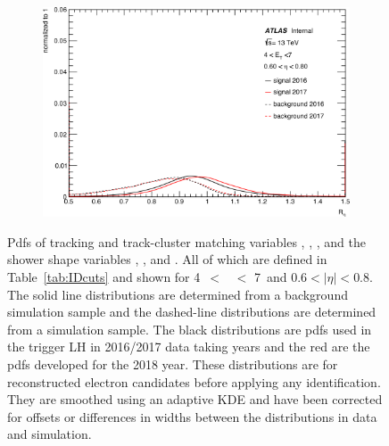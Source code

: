 \begin{figure}[p]
\begin{subfigure}[b]{0.49\textwidth}
    \includegraphics[width=1.0\textwidth]{figs/egamma/trig_reta_lowet.png} 
    \label{fig:egamma:trig_reta_lowet}
  \end{subfigure}
  \caption[Pdfs of tracking and track-cluster matching variables \TRTPID, \deltaeta, \deltaphires, and the shower shape variables \weta, \rhad, and \reta.]{Pdfs of tracking and track-cluster matching variables \TRTPID, \deltaeta, \deltaphires, and the shower shape variables \weta, \rhad, and \reta.
  All of which are defined in Table~\ref{tab:IDcuts} and shown for
  4~\GeV $<$ \et\ $<$ 7~\GeV and $0.6<|\eta|<0.8$.
  The solid line distributions are determined from a background simulation sample and the dashed-line distributions are determined from a \Zee simulation sample.
  The black distributions are pdfs used in the trigger LH in 2016/2017 data taking years and the red are the pdfs developed for the 2018 year.
  These distributions are for reconstructed electron candidates before applying any identification.
  They are smoothed using an adaptive KDE and have been corrected for offsets or differences in widths between the distributions in data and simulation.
  }
\end{figure}
